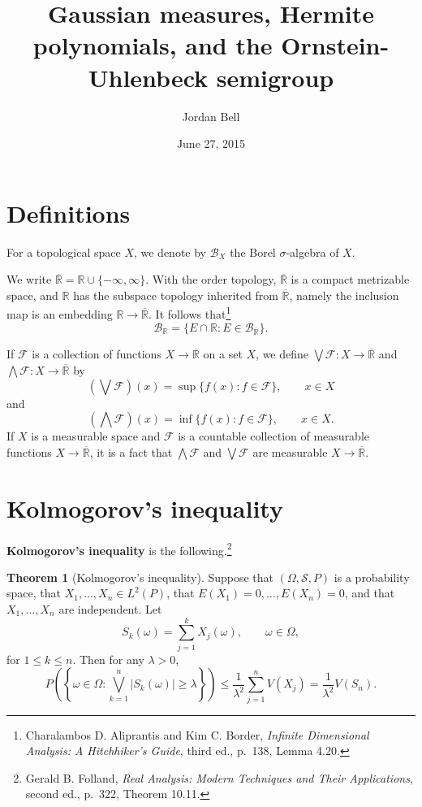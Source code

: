 \documentclass{article}
\theoremstyle{definition}
\newtheorem{theorem}{Theorem}
\theoremstyle{definition}
\begin{document}
\title{Gaussian measures, Hermite polynomials, and the Ornstein-Uhlenbeck semigroup}
\author{Jordan Bell}
\date{June 27, 2015}

\maketitle

\section{Definitions}
For a topological space $X$, we denote by $\mathscr{B}_X$ the Borel $\sigma$-algebra of $X$.

We write $\overline{\mathbb{R}}  = \mathbb{R} \cup\{-\infty,\infty\}$. With the order topology, $\overline{\mathbb{R}}$ is a compact metrizable
space, and $\mathbb{R}$ has the subspace topology inherited from $\overline{\mathbb{R}}$, namely the inclusion map
is an embedding $\mathbb{R} \to \overline{\mathbb{R}}$. It follows that\footnote{Charalambos D. Aliprantis
and Kim C. Border, {\em Infinite Dimensional Analysis: A Hitchhiker's Guide}, third ed., p.~138, Lemma 4.20.}
\[
\mathscr{B}_{\mathbb{R}} = \{E \cap \mathbb{R}: E \in \mathscr{B}_{\overline{\mathbb{R}}}\}.
\]

If $\mathscr{F}$ is a collection of functions $X \to \overline{\mathbb{R}}$ on a  set $X$, we define $\bigvee \mathscr{F}:X \to \overline{\mathbb{R}}$
and $\bigwedge \mathscr{F}:X \to \overline{\mathbb{R}}$ by
\[
\left(\bigvee \mathscr{F} \right)(x) = \sup\{f(x): f \in \mathscr{F}\}, \qquad x \in X
\]
and
\[
\left(\bigwedge \mathscr{F} \right)(x) = \inf\{f(x): f \in \mathscr{F}\}, \qquad x \in X.
\]
If $X$ is a measurable space and $\mathscr{F}$ is a countable collection of measurable functions $X \to \overline{\mathbb{R}}$,
it is a fact that $\bigwedge \mathscr{F}$ and $\bigvee \mathscr{F}$ are measurable $X \to \overline{\mathbb{R}}$. 




\section{Kolmogorov's inequality}
\textbf{Kolmogorov's inequality} is the following.\footnote{Gerald B. Folland, {\em Real Analysis: Modern Techniques and Their
Applications}, second ed., p.~322, Theorem 10.11.}

\begin{theorem}[Kolmogorov's inequality]
Suppose that $(\Omega,\mathscr{S},P)$ is a probability space, that
$X_1,\ldots,X_n \in L^2(P)$, that $E(X_1)=0,\ldots,E(X_n)=0$, and that
$X_1,\ldots,X_n$ are independent. Let
\[
S_k(\omega) = \sum_{j=1}^k X_j(\omega), \qquad \omega \in \Omega,
\]
for $1 \leq k \leq n$. Then for any $\lambda>0$,
\[
P\left(\left\{\omega \in \Omega: \bigvee_{k=1}^n |S_k(\omega)| \geq \lambda \right\}\right) \leq \frac{1}{\lambda^2} \sum_{j=1}^n V(X_j)
=\frac{1}{\lambda^2} V(S_n).
\]
\end{theorem}
\end{document}
